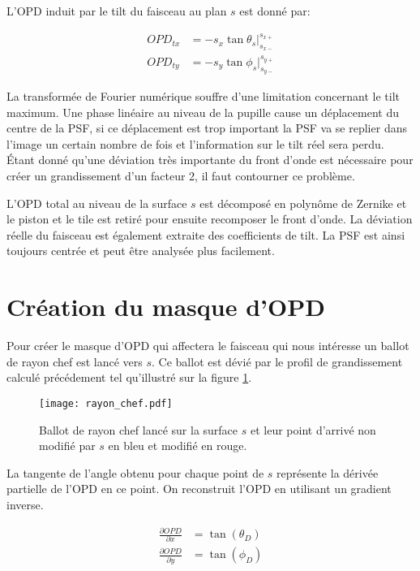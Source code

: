 \documentclass[a4paper,10pt]{article}
\numberwithin{equation}{section}
\numberwithin{figure}{section}
\numberwithin{table}{section}
\begin{document}
L'OPD induit par le tilt du faisceau au plan $s$ est donné par:

\begin{align}
	OPD_{tx} &= -s_x \tan{\theta_s} |_{s_{x-}}^{s_{x+}} \\
	OPD_{ty} &= -s_y \tan{\phi_s} |_{s_{y-}}^{s_{y+}}
\end{align}

La transformée de Fourier numérique souffre d'une limitation concernant le tilt maximum. Une phase linéaire au niveau de la pupille cause un déplacement du centre de la PSF, si ce déplacement est trop important la PSF va se replier dans l'image un certain nombre de fois et l'information sur le tilt réel sera perdu. Étant donné qu'une déviation très importante du front d'onde est nécessaire pour créer un grandissement d'un facteur 2, il faut contourner ce problème.

L'OPD total au niveau de la surface $s$ est décomposé en polynôme de Zernike et le piston et le tile est retiré pour ensuite recomposer le front d'onde. La déviation réelle du faisceau est également extraite des coefficients de tilt. La PSF est ainsi toujours centrée et peut être analysée plus facilement.

\section{Création du masque d'OPD}

Pour créer le masque d'OPD qui affectera le faisceau qui nous intéresse un ballot de rayon chef est lancé vers $s$. Ce ballot est dévié par le profil de grandissement calculé précédement tel qu'illustré sur la figure \ref{fig:rayon_chef}. 

\begin{figure}[ht]
	\centering
	\texttt{[image: rayon\_chef.pdf]}
	\caption{Ballot de rayon chef lancé sur la surface $s$ et leur point d'arrivé non modifié par $s$ en bleu et modifié en rouge.}
	\label{fig:rayon_chef}
\end{figure}

La tangente de l'angle obtenu pour chaque point de $s$ représente la dérivée partielle de l'OPD en ce point. On reconstruit l'OPD en utilisant un gradient inverse.

\begin{align}
	\frac{\partial OPD}{\partial x} &= \tan(\theta_D) 
	\label{eq:dopddx}\\
	\frac{\partial OPD}{\partial y} &= \tan(\phi_D)
\end{align}
\end{document}
